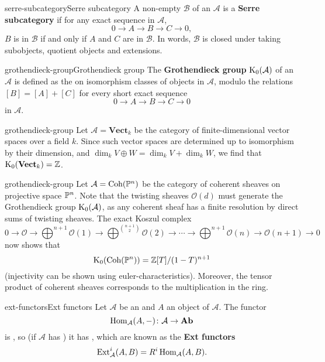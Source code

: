 \begin{topic}{serre-subcategory}{Serre subcategory}
    A non-empty  $\mathcal{B}$ of an  $\mathcal{A}$ is a \textbf{Serre subcategory} if for any exact sequence in $\mathcal{A}$,
    \[ 0 \to A \to B \to C \to 0 , \]
    $B$ is in $\mathcal{B}$ if and only if $A$ and $C$ are in $\mathcal{B}$. In words, $\mathcal{B}$ is closed under taking subobjects, quotient objects and extensions.
\end{topic}

\begin{topic}{grothendieck-group}{Grothendieck group}
    The \textbf{Grothendieck group} $\textup{K}_0(\mathcal{A})$ of an  $\mathcal{A}$ is defined as the  on isomorphism classes of objects in $\mathcal{A}$, modulo the relations $[B] = [A] + [C]$ for every short exact sequence
    \[ 0 \to A \to B \to C \to 0 \]
    in $\mathcal{A}$.
\end{topic}

\begin{example}{grothendieck-group}
    Let $\mathcal{A} = \textbf{Vect}_k$ be the category of finite-dimensional vector spaces over a field $k$. Since such vector spaces are determined up to isomorphism by their dimension, and $\dim_k V \oplus W = \dim_k V + \dim_k W$, we find that $\textup{K}_0(\textbf{Vect}_k) = \mathbb{Z}$.
\end{example}

\begin{example}{grothendieck-group}
    Let $\mathcal{A} = \textup{Coh}(\mathbb{P}^n)$ be the category of coherent sheaves on projective space $\mathbb{P}^n$. Note that the twisting sheaves $\mathcal{O}(d)$ must generate the Grothendieck group $\textup{K}_0(\mathcal{A})$, as any coherent sheaf has a finite resolution by direct sums of twisting sheaves. The exact Koszul complex
    \[ 0 \to \mathcal{O} \to \bigoplus^{n + 1} \mathcal{O}(1) \to \bigoplus^{\binom{n + 1}{2}} \mathcal{O}(2) \to \cdots \to \bigoplus^{n + 1} \mathcal{O}(n) \to \mathcal{O}(n + 1) \to 0 \]
    now shows that
    \[ \textup{K}_0(\textup{Coh}(\mathbb{P}^n)) = \mathbb{Z}[T] / (1 - T)^{n + 1} \]
    (injectivity can be shown using euler-characteristics). Moreover, the tensor product of coherent sheaves corresponds to the multiplication in the ring.
\end{example}

\begin{topic}{ext-functors}{Ext functors}
    Let $\mathcal{A}$ be an  and $A$ an object of $\mathcal{A}$. The functor
    \[ \operatorname{Hom}_{\mathcal{A}}(A, -) \colon \mathcal{A} \to \textbf{Ab} \]
    is , so (if $\mathcal{A}$ has ) it has , which are known as the \textbf{Ext functors}
    \[ \textup{Ext}^i_\mathcal{A}(A, B) = R^i \operatorname{Hom}_\mathcal{A}(A, B) . \]
\end{topic}

